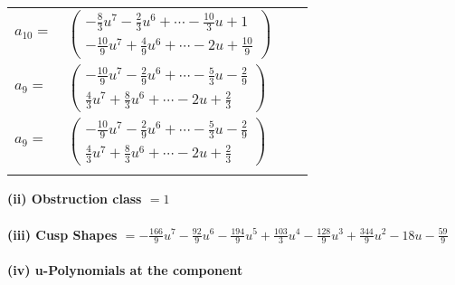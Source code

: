 \documentclass[1p]{elsarticle_modified}
\theoremstyle{definition}
\begin{document}
\begin{tabular}{m{7pt} m{180pt} m{7pt} m{180pt} }
\flushright $a_{10}=$&$\begin{pmatrix}-\frac{8}{3} u^7-\frac{2}{3} u^6+\cdots-\frac{10}{3} u+1\\-\frac{10}{9} u^7+\frac{4}{9} u^6+\cdots-2 u+\frac{10}{9}\end{pmatrix}$ \\
\flushright $a_{9}=$&$\begin{pmatrix}-\frac{10}{9} u^7-\frac{2}{9} u^6+\cdots-\frac{5}{3} u-\frac{2}{9}\\\frac{4}{3} u^7+\frac{8}{3} u^6+\cdots-2 u+\frac{2}{3}\end{pmatrix}$\\ \flushright $a_{9}=$&$\begin{pmatrix}-\frac{10}{9} u^7-\frac{2}{9} u^6+\cdots-\frac{5}{3} u-\frac{2}{9}\\\frac{4}{3} u^7+\frac{8}{3} u^6+\cdots-2 u+\frac{2}{3}\end{pmatrix}$\\&\end{tabular}
\flushleft \textbf{(ii) Obstruction class $= 1$}\\~\\
\flushleft \textbf{(iii) Cusp Shapes $= -\frac{166}{9} u^7-\frac{92}{9} u^6-\frac{194}{9} u^5+\frac{103}{3} u^4-\frac{128}{9} u^3+\frac{344}{9} u^2-18 u-\frac{59}{9}$}\\~\\
\newpage\renewcommand{\arraystretch}{1}
\flushleft \textbf{(iv) u-Polynomials at the component}\newline \\
\end{document}
